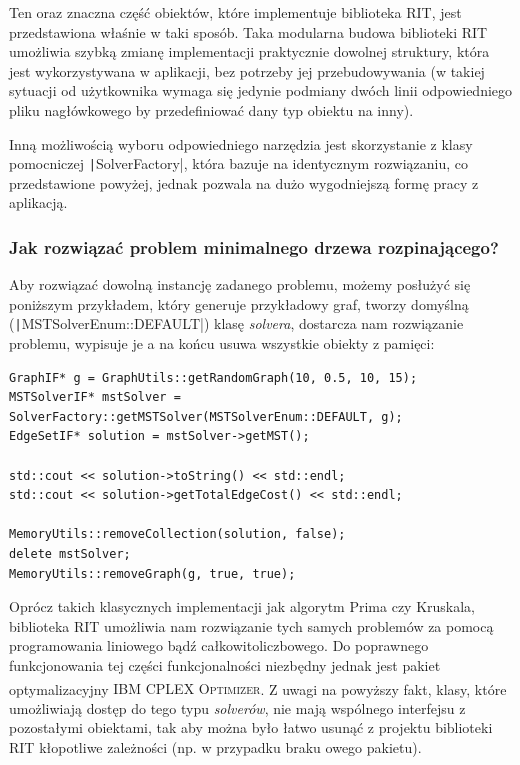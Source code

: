 Ten oraz znaczna część obiektów, które implementuje biblioteka \textsc{RIT}, jest przedstawiona właśnie w taki sposób. Taka modularna budowa biblioteki \textsc{RIT} umożliwia szybką zmianę implementacji praktycznie dowolnej struktury, która jest wykorzystywana w aplikacji, bez potrzeby jej przebudowywania (w takiej sytuacji od użytkownika wymaga się jedynie podmiany dwóch linii odpowiedniego pliku nagłówkowego by przedefiniować dany typ obiektu na inny).

Inną możliwością wyboru odpowiedniego narzędzia jest skorzystanie z klasy pomocniczej \texttt|SolverFactory|, która bazuje na identycznym rozwiązaniu, co przedstawione powyżej, jednak pozwala na dużo wygodniejszą formę pracy z aplikacją.

\subsubsection{Jak rozwiązać problem minimalnego drzewa rozpinającego?}

Aby rozwiązać dowolną instancję zadanego problemu, możemy posłużyć się poniższym przykładem, który generuje przykładowy graf, tworzy domyślną (\texttt|MSTSolverEnum::DEFAULT|) klasę \textit{solvera}, dostarcza nam rozwiązanie problemu, wypisuje je a na końcu usuwa wszystkie obiekty z pamięci:

\begin{verbatim}
GraphIF* g = GraphUtils::getRandomGraph(10, 0.5, 10, 15);
MSTSolverIF* mstSolver = SolverFactory::getMSTSolver(MSTSolverEnum::DEFAULT, g);
EdgeSetIF* solution = mstSolver->getMST();

std::cout << solution->toString() << std::endl;
std::cout << solution->getTotalEdgeCost() << std::endl;

MemoryUtils::removeCollection(solution, false);
delete mstSolver;
MemoryUtils::removeGraph(g, true, true);
\end{verbatim}

Oprócz takich klasycznych implementacji jak algorytm Prima czy Kruskala, biblioteka \textsc{RIT} umożliwia nam rozwiązanie tych samych problemów za pomocą programowania liniowego bądź całkowitoliczbowego. Do poprawnego funkcjonowania tej części funkcjonalności niezbędny jednak jest pakiet optymalizacyjny \textsc{IBM\textsuperscript{\textregistered} CPLEX\textsuperscript{\textregistered} Optimizer}. Z uwagi na powyższy fakt, klasy, które umożliwiają dostęp do tego typu \textit{solverów}, nie mają wspólnego interfejsu z pozostałymi obiektami, tak aby można było łatwo usunąć z projektu biblioteki \textsc{RIT} kłopotliwe zależności (np. w przypadku braku owego pakietu).

